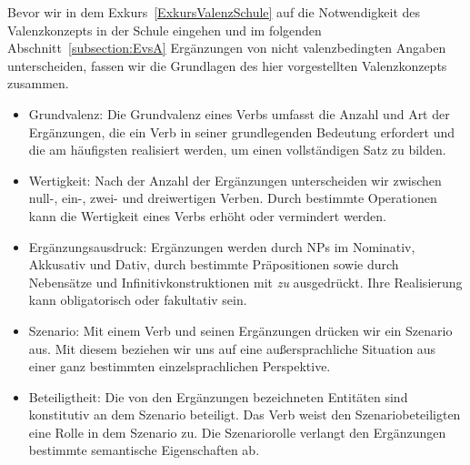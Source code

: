 Bevor wir in dem Exkurs~\ref{ExkursValenzSchule} auf die Notwendigkeit des Valenzkonzepts in der Schule eingehen und im folgenden Abschnitt~\ref{subsection:EvsA} Ergänzungen von nicht valenzbedingten Angaben unterscheiden, fassen wir die Grundlagen des hier vorgestellten Valenzkonzepts zusammen.

\newpage
\begin{itemize}  

\item Grundvalenz: Die Grundvalenz eines Verbs umfasst die Anzahl und Art der Ergänzungen, die ein Verb in seiner grundlegenden Bedeutung erfordert und die am häufigsten realisiert werden, um einen vollständigen Satz zu bilden. 

\item Wertigkeit: Nach der Anzahl der Ergänzungen unterscheiden wir zwischen null-, ein-, zwei- und dreiwertigen Verben. Durch bestimmte Operationen kann die Wertigkeit eines Verbs erhöht oder vermindert werden.

\item Ergänzungsausdruck: Ergänzungen werden durch NPs im Nominativ, Akkusativ und Dativ, durch bestimmte Präpositionen sowie durch Nebensätze und Infinitivkonstruktionen mit \textit{zu} ausgedrückt. Ihre Realisierung kann obligatorisch oder fakultativ sein.

\item Szenario: Mit einem Verb und seinen Ergänzungen drücken wir ein Szenario aus. Mit diesem beziehen wir uns auf eine außersprachliche Situation aus einer ganz bestimmten einzelsprachlichen Perspektive. 

\item Beteiligtheit: Die von den Ergänzungen bezeichneten Entitäten sind konstitutiv an dem Szenario beteiligt. Das Verb weist den Szenariobeteiligten eine Rolle in dem Szenario zu. Die Szenariorolle verlangt den Ergänzungen bestimmte semantische Eigenschaften ab. 

\end{itemize}  

\newpage

